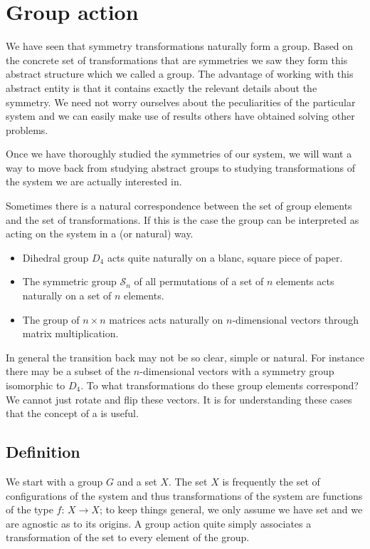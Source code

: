 \section{Group action}
We have seen that symmetry transformations naturally form a group. Based on the concrete set of transformations that are symmetries we saw they form this abstract structure which we called a group. The advantage of working with this abstract entity is that it contains exactly the relevant details about the symmetry. We need not worry ourselves about the peculiarities of the particular system and we can easily make use of results others have obtained solving other problems.

Once we have thoroughly studied the symmetries of our system, we will want a way to move back from studying abstract groups to studying transformations of the system we are actually interested in.

Sometimes there is a natural correspondence between the set of group elements and the set of transformations. If this is the case the group can be interpreted as acting on the system in a  (or natural) way.

\begin{example}
\begin{itemize}
\item Dihedral group $D_4$ acts quite naturally on a blanc, square piece of paper.
\item The symmetric group $\mathcal{S}_n$ of all permutations of a set of $n$ elements acts naturally on a set of $n$ elements.
\item The group of $n\times n$ matrices acts naturally on $n$-dimensional vectors through matrix multiplication.
\end{itemize}
\end{example}

In general the transition back may not be so clear, simple or natural. For instance there may be a subset of the $n$-dimensional vectors with a symmetry group isomorphic to $D_4$. To what transformations do these group elements correspond? We cannot just rotate and flip these vectors. It is for understanding these cases that the concept of a  is useful.

\subsection{Definition}
We start with a group $G$ and a set $X$. The set $X$ is frequently the set of configurations of the system and thus transformations of the system are functions of the type $f:\,X\to X$; to keep things general, we only assume we have set and we are agnostic as to its origins.
A group action quite simply associates a transformation of the set to every element of the group.

